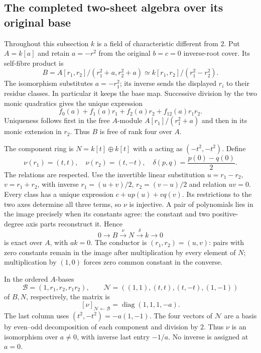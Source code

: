 \subsection{The completed two-sheet algebra over its original base}
Throughout this subsection $k$ is a field of characteristic different from
$2$. Put $A=k[a]$ and retain $a=-r^2$ from the original $b=c=0$
inverse-root cover. Its self-fibre product is
\[
 B=A[r_1,r_2]/(r_1^2+a,r_2^2+a)
   \simeq k[r_1,r_2]/(r_1^2-r_2^2).
\]
The isomorphism substitutes $a=-r_1^2$; its inverse sends the displayed
$r_i$ to their residue classes. In particular it keeps the base map.
Successive division by the two monic quadratics gives the unique expression
\begin{equation}\label{eq:B-basis}
 f_0(a)+f_1(a)r_1+f_2(a)r_2+f_{12}(a)r_1r_2.
\end{equation}
Uniqueness follows first in the free $A$-module
$A[r_1]/(r_1^2+a)$ and then in its monic extension in $r_2$.
Thus $B$ is free of rank four over $A$.

The component ring is $N=k[t]\oplus k[t]$ with $a$ acting as
$(-t^2,-t^2)$. Define
\begin{equation}\label{eq:nu-r}
 \nu(r_1)=(t,t),\quad \nu(r_2)=(t,-t),\quad
 \delta(p,q)=\frac{p(0)-q(0)}2.
\end{equation}
The relations are respected. Use the invertible linear substitution
$u=r_1-r_2$, $v=r_1+r_2$, with inverse
$r_1=(u+v)/2$, $r_2=(v-u)/2$ and relation $uv=0$.
Every class has a unique expression $c+up(u)+vq(v)$.
Its restrictions to the two axes determine all three terms, so $\nu$
is injective. A pair of polynomials lies in the image precisely when
its constants agree: the constant and two positive-degree axis parts
reconstruct it. Hence
\begin{equation}\label{eq:conductor-A-exact}
 0\longrightarrow B\xrightarrow{\nu}N
 \xrightarrow{\delta}k\longrightarrow0
\end{equation}
is exact over $A$, with $ak=0$.
The conductor is $(r_1,r_2)=(u,v)$: pairs with zero constants
remain in the image after multiplication by every element of $N$;
multiplication by $(1,0)$ forces zero common constant in the converse.

In the ordered $A$-bases
\[
 \mathcal B=(1,r_1,r_2,r_1r_2),\qquad
 \mathcal N=((1,1),(t,t),(t,-t),(1,-1))
\]
of $B,N$, respectively, the matrix is
\begin{equation}\label{eq:specialization-matrix}
 [\nu]_{\mathcal N\leftarrow\mathcal B}
     =\operatorname{diag}(1,1,1,-a).
\end{equation}
The last column uses $(t^2,-t^2)=-a(1,-1)$.
The four vectors of $\mathcal N$ are a basis by even--odd decomposition
of each component and division by $2$.
Thus $\nu$ is an isomorphism over $a\ne0$, with inverse last entry
$-1/a$. No inverse is assigned at $a=0$.


